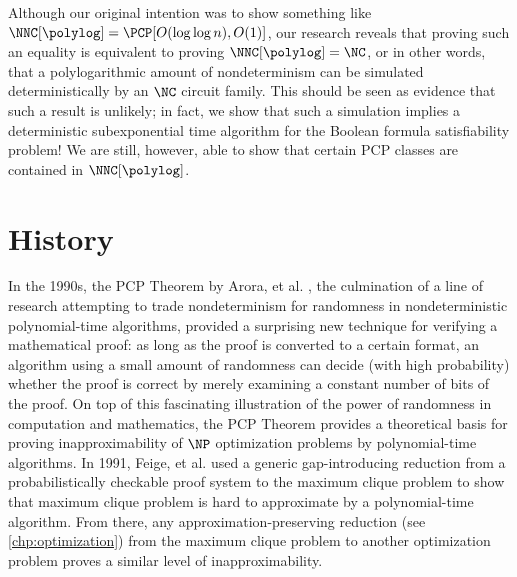 %
%
%
Although our original intention was to show something like $\NNC[\polylog] = \PCP[O(\loglog n), O(1)]$, our research reveals that proving such an equality is equivalent to proving $\NNC[\polylog] = \NC$, or in other words, that a polylogarithmic amount of nondeterminism can be simulated deterministically by an $\NC$ circuit family.
This should be seen as evidence that such a result is unlikely; in fact, we show that such a simulation implies a deterministic subexponential time algorithm for the Boolean formula satisfiability problem!
We are still, however, able to show that certain PCP classes are contained in $\NNC[\polylog]$.

%
%


\section{History}

In the 1990s, the PCP Theorem by Arora, et al. \autocite{almss92}, the culmination of a line of research attempting to trade nondeterminism for randomness in nondeterministic polynomial-time algorithms, provided a surprising new technique for verifying a mathematical proof: as long as the proof is converted to a certain format, an algorithm using a small amount of randomness can decide (with high probability) whether the proof is correct by merely examining a constant number of bits of the proof.
On top of this fascinating illustration of the power of randomness in computation and mathematics, the PCP Theorem provides a theoretical basis for proving inapproximability of $\NP$ optimization problems by polynomial-time algorithms.
In 1991, Feige, et al. \autocite{fglss91} used a generic gap-introducing reduction from a probabilistically checkable proof system to the maximum clique problem to show that maximum clique problem is hard to approximate by a polynomial-time algorithm.
From there, any approximation-preserving reduction (see \autoref{chp:optimization}) from the maximum clique problem to another optimization problem proves a similar level of inapproximability.

